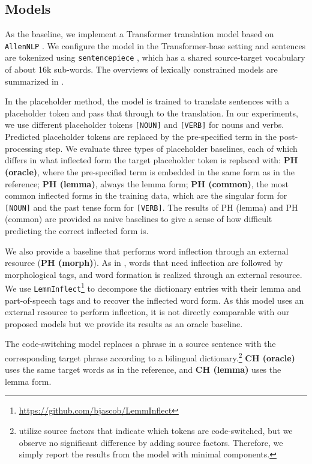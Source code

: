 \subsection{Models}
As the baseline, we implement a Transformer \citep{NIPS2017_3f5ee243} translation model based on \texttt{AllenNLP} \citep{Gardner2017AllenNLP}.
We configure the model in the Transformer-base setting and sentences are tokenized using \texttt{sentencepiece} \citep{kudo-2018-subword}, which has a shared source-target vocabulary of about 16k sub-words.
The overviews of lexically constrained models are summarized in .

In the placeholder method, the model is trained to translate sentences with a placeholder token and pass that through to the translation. In our experiments, we use different placeholder tokens \texttt{[NOUN]} and \texttt{[VERB]} for nouns and verbs.
Predicted placeholder tokens are replaced by the pre-specified term in the post-processing step.
We evaluate three types of placeholder baselines, each of which differs in what inflected form the target placeholder token is replaced with: {\bf PH (oracle)}, where the pre-specified term is embedded in the same form as in the reference; {\bf PH (lemma)}, always the lemma form; {\bf PH (common)}, the most common inflected forms in the training data, which are the singular form for \texttt{[NOUN]} and the past tense form for \texttt{[VERB]}. The results of PH (lemma) and PH (common) are provided as naive baselines to give a sense of how difficult predicting the correct inflected form is.

We also provide a baseline that performs word inflection through an external resource ({\bf PH (morph)}).
As in \citet{tamchyna-etal-2017-modeling}, words that need inflection are followed by morphological tags, and word formation is realized through an external resource.
We use \texttt{LemmInflect}\footnote{\url{https://github.com/bjascob/LemmInflect}} to decompose the dictionary entries with their lemma and part-of-speech tags and to recover the inflected word form.
As this model uses an external resource to perform inflection, it is not directly comparable with our proposed models but we provide its results as an oracle baseline.

The code-switching model replaces a phrase in a source sentence with the corresponding target phrase according to a bilingual dictionary.\footnote{\citet{dinu-etal-2019-training} utilize source factors that indicate which tokens are code-switched, but we observe no significant difference by adding source factors. Therefore, we simply report the results from the model with minimal components.}
{\bf CH (oracle)} uses the same target words as in the reference, and {\bf CH (lemma)} uses the lemma form.

